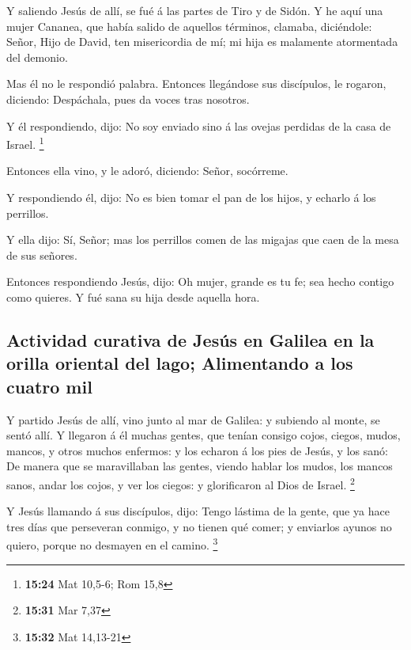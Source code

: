  Y saliendo Jesús de allí, se fué á las partes de Tiro y de
Sidón.  Y he aquí una mujer Cananea, que había salido de
aquellos términos, clamaba, diciéndole: Señor, Hijo de David, ten
misericordia de mí; mi hija es malamente atormentada del demonio.

 Mas él no le respondió palabra. Entonces llegándose sus
discípulos, le rogaron, diciendo: Despáchala, pues da voces tras
nosotros.

 Y él respondiendo, dijo: No soy enviado sino á las ovejas
perdidas de la casa de Israel. \footnote{\textbf{15:24} Mat 10,5-6; Rom
  15,8}

 Entonces ella vino, y le adoró, diciendo: Señor,
socórreme.

 Y respondiendo él, dijo: No es bien tomar el pan de los
hijos, y echarlo á los perrillos.

 Y ella dijo: Sí, Señor; mas los perrillos comen de las
migajas que caen de la mesa de sus señores.

 Entonces respondiendo Jesús, dijo: Oh mujer, grande es tu
fe; sea hecho contigo como quieres. Y fué sana su hija desde aquella
hora.

\hypertarget{actividad-curativa-de-jesuxfas-en-galilea-en-la-orilla-oriental-del-lago-alimentando-a-los-cuatro-mil}{%
\subsection{Actividad curativa de Jesús en Galilea en la orilla oriental
del lago; Alimentando a los cuatro
mil}\label{actividad-curativa-de-jesuxfas-en-galilea-en-la-orilla-oriental-del-lago-alimentando-a-los-cuatro-mil}}

 Y partido Jesús de allí, vino junto al mar de Galilea: y
subiendo al monte, se sentó allí.  Y llegaron á él muchas
gentes, que tenían consigo cojos, ciegos, mudos, mancos, y otros muchos
enfermos: y los echaron á los pies de Jesús, y los sanó: 
De manera que se maravillaban las gentes, viendo hablar los mudos, los
mancos sanos, andar los cojos, y ver los ciegos: y glorificaron al Dios
de Israel. \footnote{\textbf{15:31} Mar 7,37}

 Y Jesús llamando á sus discípulos, dijo: Tengo lástima de
la gente, que ya hace tres días que perseveran conmigo, y no tienen qué
comer; y enviarlos ayunos no quiero, porque no desmayen en el camino.
\footnote{\textbf{15:32} Mat 14,13-21}

